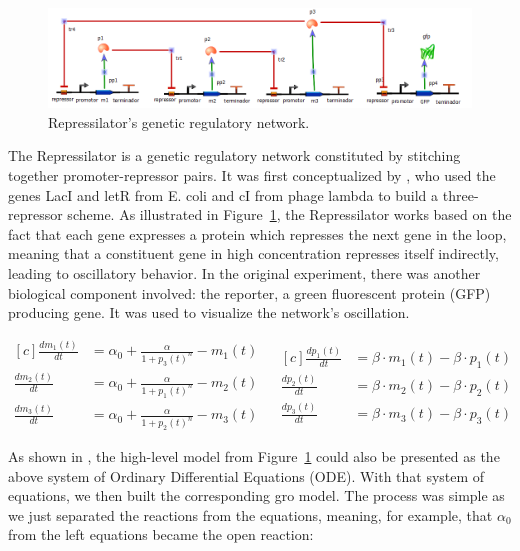 \documentclass[12pt]{article}
\begin{document}
    \begin{figure}[h]
        \centering
        \includegraphics[scale = 0.7]{repressilator_model.png}
        \caption{Repressilator's genetic regulatory network.}
        \label{fig:repressilator_model}
    \end{figure}
    
    The Repressilator is a genetic regulatory network constituted by stitching together promoter-repressor pairs. It was first conceptualized by \cite{Elowitz2000}, who used the genes LacI and letR from E. coli and cI from phage lambda to build a three-repressor scheme. As illustrated in Figure~\ref{fig:repressilator_model}, the Repressilator works based on the fact that each gene expresses a protein which represses the next gene in the loop, meaning that a constituent gene in high concentration represses itself indirectly, leading to oscillatory behavior. In the original experiment, there was another biological component involved: the reporter, a green fluorescent protein (GFP) producing gene. It was used to visualize the network's oscillation.
    
    \begin{equation}
    \begin{aligned}[c]
        \frac{dm_{1}(t)}{dt} & = \alpha_{0} + \frac{\alpha}{1 + p_{3}(t)^{n}} - m_{1}(t) & \\
        \frac{dm_{2}(t)}{dt} & = \alpha_{0} + \frac{\alpha}{1 + p_{1}(t)^{n}} - m_{2}(t) & \\
        \frac{dm_{3}(t)}{dt} & = \alpha_{0} + \frac{\alpha}{1 + p_{2}(t)^{n}} - m_{3}(t) &
    \end{aligned}
    \begin{aligned}[c]
        \frac{dp_{1}(t)}{dt} & = \beta \cdot m_{1}(t) - \beta \cdot p_{1}(t) \\
        \frac{dp_{2}(t)}{dt} & = \beta \cdot m_{2}(t) - \beta \cdot p_{2}(t) \\
        \frac{dp_{3}(t)}{dt} & = \beta \cdot m_{3}(t) - \beta \cdot p_{3}(t)
    \end{aligned}
    \end{equation}

    As shown in \cite{Elowitz2000}, the high-level model from Figure~\ref{fig:repressilator_model} could also be presented as the above system of Ordinary Differential Equations (ODE). With that system of equations, we then built the corresponding gro model. The process was simple as we just separated the reactions from the equations, meaning, for example, that $\alpha_{0}$ from the left equations became the open reaction:
    
\end{document}
